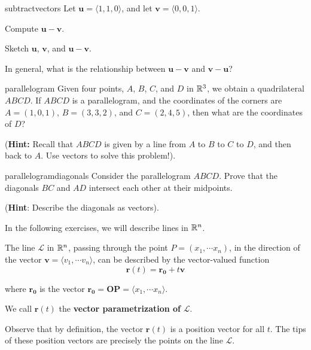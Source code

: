 \begin{problem}{subtractvectors}
    Let $\bm{u} = \langle 1, 1, 0 \rangle$, and let $\bm{v} = \langle 0, 0, 1 \rangle$. 
    
    \begin{subproblems}
    \item Compute $\bm{u-v}$.
    \item Sketch $\bm{u}$, $\bm{v}$, and $\bm{u-v}$.
    \item In general, what is the relationship between  $\bm{u-v}$ and  $\bm{v-u}$?
    \end{subproblems}
\end{problem}

\begin{problem}{parallelogram}
    Given four points, $A$, $B$, $C$, and $D$ in $\mathbb{R}^3$, we obtain a quadrilateral $ABCD$.  If $ABCD$ is a parallelogram, and the coordinates of the corners are $A = (1,0,1)$, $B = (3,3,2)$, and $C = (2,4, 5)$, then what are the coordinates of $D$?
    
    (\textbf{Hint:} Recall that $ABCD$ is given by a line from $A$ to $B$ to $C$ to $D$, and then back to $A$.  Use vectors to solve this problem!).
\end{problem}

\begin{problem}{parallelogramdiagonals}
    Consider the parallelogram $ABCD$.  Prove that the diagonals $BC$ and $AD$ intersect each other at their midpoints.
    
    (\textbf{Hint}: Describe the diagonals as vectors).
\end{problem}


In the following exercises, we will describe lines in $\mathbb{R}^n$.
    
    \begin{definition}\label{linesinrn}
    The line $\mathscr{L}$ in $\mathbb{R}^n$, passing through the point $P = (x_1, \cdots x_n)$, in the direction of the vector $\bm{v} = \langle v_1,  \cdots v_n \rangle$, can be described by the vector-valued function $$\bm{r}(t) = \bm{r_0} + t\bm{v}$$
    
    where $\bm{r_0}$ is the vector $\bm{r_0} = \bm{OP} = \langle x_1, \cdots x_n\rangle$.
    
    We call $\bm{r}(t)$ the \textbf{vector parametrization of} $\mathscr{L}$.
    
    \end{definition}

    Observe that by definition, the vector $\bm{r}(t)$ is a position vector for all $t$.  The tips of these position vectors are precisely the points on the line $\mathscr{L}$.

